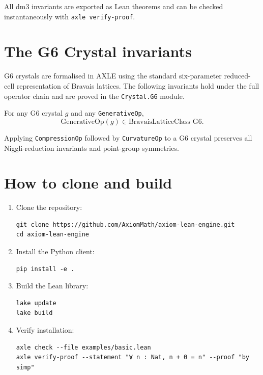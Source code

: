 All dm3 invariants are exported as Lean theorems and can be checked instantaneously with \texttt{axle verify-proof}.

\section{The G6 Crystal invariants}

G6 crystals are formalised in AXLE using the standard six-parameter reduced-cell representation of Bravais lattices. The following invariants hold under the full operator chain and are proved in the \texttt{Crystal.G6} module.

\begin{theorem}
For any G6 crystal \( g \) and any \texttt{GenerativeOp},
\[
\text{GenerativeOp}(g) \in \text{BravaisLatticeClass G6}.
\]
\end{theorem}

\begin{theorem}
Applying \texttt{CompressionOp} followed by \texttt{CurvatureOp} to a G6 crystal preserves all Niggli-reduction invariants and point-group symmetries.
\end{theorem}

\section{How to clone and build}

\begin{enumerate}
\item Clone the repository:
\begin{verbatim}
git clone https://github.com/AxiomMath/axiom-lean-engine.git
cd axiom-lean-engine
\end{verbatim}

\item Install the Python client:
\begin{verbatim}
pip install -e .
\end{verbatim}

\item Build the Lean library:
\begin{verbatim}
lake update
lake build
\end{verbatim}

\item Verify installation:
\begin{verbatim}
axle check --file examples/basic.lean
axle verify-proof --statement "∀ n : Nat, n + 0 = n" --proof "by simp"
\end{verbatim}
\end{enumerate}

